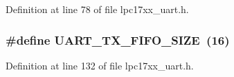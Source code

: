 Definition at line 78 of file lpc17xx\+\_\+uart.\+h.

\subsubsection[{\texorpdfstring{U\+A\+R\+T\+\_\+\+T\+X\+\_\+\+F\+I\+F\+O\+\_\+\+S\+I\+ZE}{UART_TX_FIFO_SIZE}}]{\setlength{\rightskip}{0pt plus 5cm}\#define U\+A\+R\+T\+\_\+\+T\+X\+\_\+\+F\+I\+F\+O\+\_\+\+S\+I\+ZE~(16)}\hypertarget{group___u_a_r_t___private___macros_ga94b76465adbb4fb96c821ef0866cbd0f}{}\label{group___u_a_r_t___private___macros_ga94b76465adbb4fb96c821ef0866cbd0f}


Definition at line 132 of file lpc17xx\+\_\+uart.\+h.

